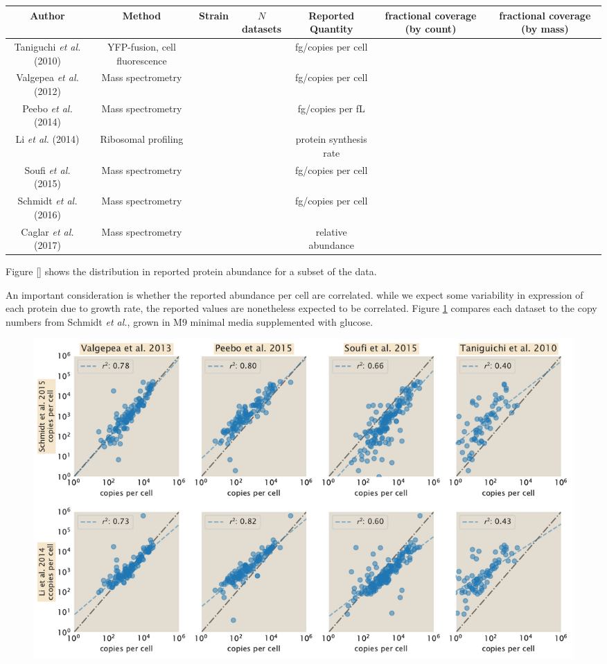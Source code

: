 \documentclass[11pt, letterpaper]{article}
\begin{document}
\begin{tabularx}{.8\textwidth}{ || c | c | c | c | c | c | c || }
\hline
Author & Method & Strain & $N$ datasets & Reported Quantity & fractional coverage (by count) & fractional coverage (by mass) \\
\hline\hline
Taniguchi {\it et al.} (2010) & YFP-fusion, cell fluorescence  & & & fg/copies per cell & & \\
\hline
Valgepea {\it et al.} (2012) & Mass spectrometry  & & & fg/copies per cell & & \\
\hline
Peebo {\it et al.} (2014) & Mass spectrometry  & & & fg/copies per fL & & \\
\hline
Li {\it et al.} (2014) & Ribosomal profiling  & & & protein synthesis rate & & \\
\hline
Soufi {\it et al.} (2015) & Mass spectrometry  & & & fg/copies per cell & &\\
\hline
Schmidt {\it et al.} (2016) & Mass spectrometry  & & & fg/copies per cell & & \\
\hline
Caglar {\it et al.} (2017) & Mass spectrometry  & & & relative abundance & &\\
\hline
\end{tabularx}

Figure \ref{} shows the distribution in reported protein abundance for   a  subset
of  the data.

An important consideration is whether the reported abundance per cell are correlated. while
we expect some variability in expression of each protein due to growth rate, the reported
values are nonetheless expected to be correlated. Figure \ref{fig:dataset_correlations} compares each dataset to the copy numbers from Schmidt {\it et al.}, grown in M9 minimal media supplemented with glucose.

\begin{figure}[H]
		\centering
    \includegraphics[width=1\textwidth]{../../figures/dataset_correlations.pdf}
  \caption{}
  \label{fig:dataset_correlations}
\end{figure}
\end{document}
